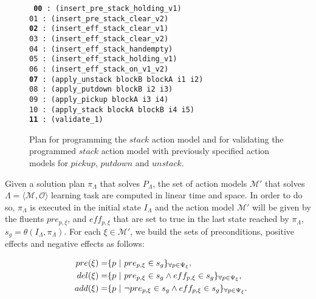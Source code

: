 \documentclass[runningheads]{llncs}
\newcommand{\tup}[1]{{\langle #1 \rangle}}
\begin{document}
\begin{figure}[hbt!]
	{\footnotesize\tt
		{\bf 00} : (insert\_pre\_stack\_holding\_v1) \\
		01 : (insert\_pre\_stack\_clear\_v2)\\
		{\bf 02} : (insert\_eff\_stack\_clear\_v1)\\
		03 : (insert\_eff\_stack\_clear\_v2)\\
		04 : (insert\_eff\_stack\_handempty)\\
		05 : (insert\_eff\_stack\_holding\_v1)\\
		06 : (insert\_eff\_stack\_on\_v1\_v2)\\
		{\bf 07} : (apply\_unstack blockB blockA i1 i2)\\
		08 : (apply\_putdown blockB i2 i3)\\
		09 : (apply\_pickup blockA i3 i4)\\
		10 : (apply\_stack blockA blockB i4 i5)\\
		{\bf 11} : (validate\_1)
	}
	\caption{\small Plan for programming the $stack$ action model and for validating the programmed $stack$ action model with previously specified action models for $pickup$, $putdown$ and $unstack$.}
	\label{fig:plan-lplan}
\end{figure}

Given a solution plan $\pi_\Lambda$ that solves $P_{\Lambda}$, the set of action models $\mathcal{M}'$ that solves $\Lambda=\tup{\mathcal{M},\mathcal{O}}$ learning task are computed in linear time and space. In order to do so, $\pi_\Lambda$ is executed in the initial state $I_{\Lambda}$ and the action model $\mathcal{M}'$ will be given by the fluents $pre_{p,\xi}$, and $eff_{p,\xi}$ that are set to true in the last state reached by $\pi_\Lambda$, $s_g=\theta(I_\Lambda,\pi_\Lambda)$. For each $\xi \in \mathcal{M'}$, we build the sets of preconditions, positive effects and negative effects as follows:

\begin{small}
	\begin{align*}
	  \hspace*{7pt}pre(\xi)=& \{p ~|~ pre_{p,\xi} \in s_g\}_{\forall p \in \Psi_\xi},\\
	  \hspace*{7pt}del(\xi)=& \{p ~|~ pre_{p,\xi} \in s_g \wedge eff_{p,\xi} \in s_g\}_{\forall p \in \Psi_\xi},\\
	  \hspace*{7pt}add(\xi)=& \{p ~|~ \neg pre_{p,\xi} \in s_g \wedge eff_{p,\xi} \in s_g\}_{\forall p \in \Psi_\xi}.
	\end{align*}
\end{small}
\end{document}
